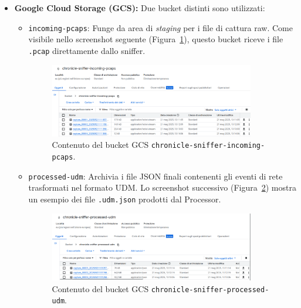 \documentclass[11pt, a4paper]{article}
\begin{document}
\begin{itemize}[leftmargin=*, label=\textbullet]
    \item \textbf{Google Cloud Storage (GCS):} Due bucket distinti sono utilizzati:
    \begin{itemize}
        \item \texttt{incoming-pcaps}: Funge da area di \textit{staging} per i file di cattura raw. Come visibile nello screenshot seguente (Figura~\ref{fig:gcs_incoming}), questo bucket riceve i file \texttt{.pcap} direttamente dallo sniffer.
        \begin{figure}[H]
            \centering
            \includegraphics[width=0.9\textwidth]{pics/GCS_INCOMING_131510.png}
            \caption{Contenuto del bucket GCS \texttt{chronicle-sniffer-incoming-pcaps}.}
            \label{fig:gcs_incoming}
        \end{figure}
        \item \texttt{processed-udm}: Archivia i file JSON finali contenenti gli eventi di rete trasformati nel formato UDM. Lo screenshot successivo (Figura~\ref{fig:gcs_processed}) mostra un esempio dei file \texttt{.udm.json} prodotti dal Processor.
        \begin{figure}[H]
            \centering
            \includegraphics[width=0.9\textwidth]{pics/GCS_PROCESSED_131456.png}
            \caption{Contenuto del bucket GCS \texttt{chronicle-sniffer-processed-udm}.}
            \label{fig:gcs_processed}
        \end{figure}
    \end{itemize} 
    

\end{itemize}
\end{document}

